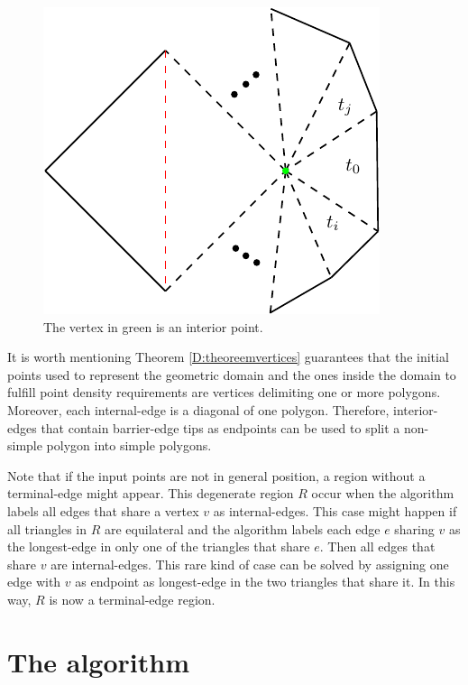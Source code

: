 \documentclass[lineno,pdflatex,sn-mathphys]{sn-jnl}%
\theoremstyle{thmstyleone}%
\theoremstyle{thmstyletwo}%
\theoremstyle{thmstylethree}%
\begin{document}
\begin{figure}[h]
\centering
\includegraphics[width=0.25\linewidth]{demostracionlemma2.1} 
\caption{The  vertex in green is an interior point.}
\label{fig:lemmaquitadomingos}    
\end{figure}


It is worth mentioning Theorem \ref{D:theoreemvertices} guarantees that  the initial points used to represent the geometric domain and the ones inside the domain to fulfill point density requirements  are vertices delimiting one or more polygons. Moreover, each  internal-edge is a diagonal of one polygon. Therefore,  interior-edges that contain barrier-edge tips as endpoints  can be used to split a non-simple polygon into simple polygons.


Note that if the input points are not in general position,  a region without a terminal-edge might appear. This  degenerate region $R$ occur when the algorithm  labels all edges that share a vertex $v$ as internal-edges. This case might happen 
if all triangles in $R$ are equilateral and the algorithm labels each edge $e$ sharing $v$ as the longest-edge in only one of the triangles that share $e$. Then all edges that share $v$ are internal-edges. This rare kind of case can be solved  by  assigning one edge with  $v$ as endpoint as longest-edge in  the two triangles that share it. In this way, $R$ is now a terminal-edge region.


\section{The algorithm}
\label{sec:the_algorithm}
\end{document}
